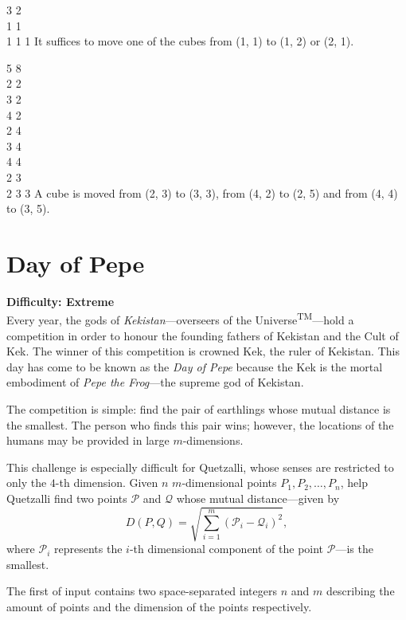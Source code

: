 \documentclass{contest-set}
\begin{document}
\addsampleExplanation
{
3 2\\
1 1\\
1 1
}
{
1
}
{
It suffices to move one of the cubes from (1, 1) to (1, 2) or (2, 1).
}

\pushnewpage

\addsampleExplanation
{
5 8\\
2 2\\
3 2\\
4 2\\
2 4\\
3 4\\
4 4\\
2 3\\
2 3
}
{
3
}
{
A cube is moved from (2, 3) to (3, 3), from (4, 2) to (2, 5) and from (4, 4) to (3, 5).
}

\newpage
\section{Day of Pepe}
\textbf{Difficulty: Extreme}\\[0.5\baselineskip]
Every year, the gods of \textit{Kekistan}---overseers of the Universe\textsuperscript{TM}---hold a competition in order to honour the founding fathers of Kekistan and the Cult of Kek. The winner of this competition is crowned Kek, the ruler of Kekistan.  This day has come to be known as the \textit{Day of Pepe} because the Kek is the mortal embodiment of \textit{Pepe the Frog}---the supreme god of Kekistan.

The competition is simple: find the pair of earthlings whose mutual distance is the smallest. The person who finds this pair wins; however, the locations of the humans may be provided in large $m$-dimensions. 

This challenge is especially difficult for Quetzalli, whose senses are restricted to only the $4$-th dimension. Given $n$ $m$-dimensional points $P_1, P_2,\ldots,P_n$, help Quetzalli find two points $\mathcal{P}$ and $\mathcal{Q}$ whose mutual distance---given by \begin{equation*}
    D(P, Q)=\sqrt{\sum^m_{i=1}(\mathcal{P}_i-\mathcal{Q}_i)^2},
\end{equation*} where $\mathcal{P}_i$ represents the $i$-th dimensional component of the point $\mathcal{P}$---is the smallest.

The first of input contains two space-separated integers $n$ and $m$ describing the amount of points and the dimension of the points respectively.
\end{document}
